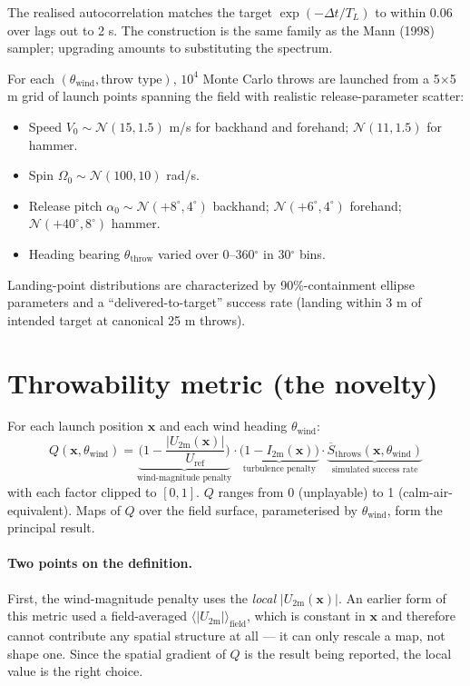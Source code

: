 \documentclass[11pt,letterpaper]{article}
\begin{document}
The realised autocorrelation matches the target $\exp(-\Delta t/T_L)$ to within
0.06 over lags out to 2 s. The construction is the same family as the Mann
(1998) sampler; upgrading amounts to substituting the spectrum.

For each $(\theta_{\text{wind}}, \text{throw type})$, $10^4$ Monte Carlo throws are launched from a 5$\times$5 m grid of launch points spanning the field with realistic release-parameter scatter:
\begin{itemize}[leftmargin=*,itemsep=1pt]
  \item Speed $V_0 \sim \mathcal{N}(15, 1.5)$ m/s for backhand and forehand; $\mathcal{N}(11, 1.5)$ for hammer.
  \item Spin $\Omega_0 \sim \mathcal{N}(100, 10)$ rad/s.
  \item Release pitch $\alpha_0 \sim \mathcal{N}(+8^\circ, 4^\circ)$ backhand; $\mathcal{N}(+6^\circ, 4^\circ)$ forehand; $\mathcal{N}(+40^\circ, 8^\circ)$ hammer.
  \item Heading bearing $\theta_{\text{throw}}$ varied over 0--360$^\circ$ in 30$^\circ$ bins.
\end{itemize}
Landing-point distributions are characterized by 90\%-containment ellipse parameters and a ``delivered-to-target'' success rate (landing within 3 m of intended target at canonical 25 m throws).

\section{Throwability metric (the novelty)}
\label{sec:throwability}

For each launch position $\mathbf{x}$ and each wind heading $\theta_{\text{wind}}$:
\begin{equation}
Q(\mathbf{x}, \theta_{\text{wind}}) =
\underbrace{\Big(1 - \frac{|U_{2\text{m}}(\mathbf{x})|}{U_{\text{ref}}}\Big)}_{\text{wind-magnitude penalty}}
\cdot
\underbrace{\big(1 - I_{2\text{m}}(\mathbf{x})\big)}_{\text{turbulence penalty}}
\cdot
\underbrace{\overline{S}_{\text{throws}}(\mathbf{x}, \theta_{\text{wind}})}_{\text{simulated success rate}}
\label{eq:Q}
\end{equation}
with each factor clipped to $[0, 1]$. $Q$ ranges from 0 (unplayable) to 1
(calm-air-equivalent). Maps of $Q$ over the field surface, parameterised by
$\theta_{\text{wind}}$, form the principal result.

\paragraph{Two points on the definition.} First, the wind-magnitude penalty uses
the \emph{local} $|U_{2\text{m}}(\mathbf{x})|$. An earlier form of this metric
used a field-averaged $\langle |U_{2\text{m}}|\rangle_{\text{field}}$, which is
constant in $\mathbf{x}$ and therefore cannot contribute any spatial structure
at all --- it can only rescale a map, not shape one. Since the spatial gradient
of $Q$ is the result being reported, the local value is the right choice.
\end{document}
